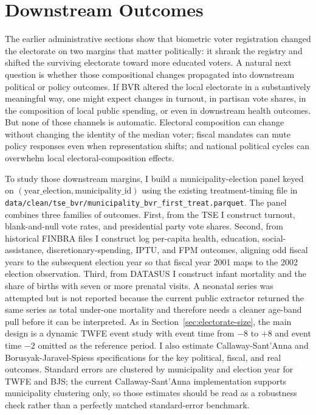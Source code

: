 \section{Downstream Outcomes}
\label{sec:downstream-outcomes}

The earlier administrative sections show that biometric voter registration changed the electorate on two margins that matter politically: it shrank the registry and shifted the surviving electorate toward more educated voters. A natural next question is whether those compositional changes propagated into downstream political or policy outcomes. If BVR altered the local electorate in a substantively meaningful way, one might expect changes in turnout, in partisan vote shares, in the composition of local public spending, or even in downstream health outcomes. But none of those channels is automatic. Electoral composition can change without changing the identity of the median voter; fiscal mandates can mute policy responses even when representation shifts; and national political cycles can overwhelm local electoral-composition effects.

To study those downstream margins, I build a municipality-election panel keyed on $(\text{year\_election}, \text{municipality\_id})$ using the existing treatment-timing file in \texttt{data/clean/tse\_bvr/municipality\_bvr\_first\_treat.parquet}. The panel combines three families of outcomes. First, from the TSE I construct turnout, blank-and-null vote rates, and presidential party vote shares. Second, from historical FINBRA files I construct log per-capita health, education, social-assistance, discretionary-spending, IPTU, and FPM outcomes, aligning odd fiscal years to the subsequent election year so that fiscal year 2001 maps to the 2002 election observation. Third, from DATASUS I construct infant mortality and the share of births with seven or more prenatal visits. A neonatal series was attempted but is not reported because the current public extractor returned the same series as total under-one mortality and therefore needs a cleaner age-band pull before it can be interpreted. As in Section~\ref{sec:electorate-size}, the main design is a dynamic TWFE event study with event time from $-8$ to $+8$ and event time $-2$ omitted as the reference period. I also estimate Callaway-Sant'Anna and Borusyak-Jaravel-Spiess specifications for the key political, fiscal, and real outcomes. Standard errors are clustered by municipality and election year for TWFE and BJS; the current Callaway-Sant'Anna implementation supports municipality clustering only, so those estimates should be read as a robustness check rather than a perfectly matched standard-error benchmark.


